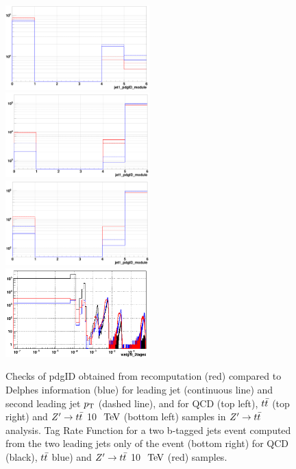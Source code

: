 \documentclass{cernrep}
\begin{document}
\begin{figure}[!htb]\centering
\includegraphics[width=0.495\textwidth]{Fig/check_TRF/Zptt/jet12pdgID_QCD5f_redModule_blueDELPHES.png}
\includegraphics[width=0.495\textwidth]{Fig/check_TRF/Zptt/jet12pdgID_ttbar_redModule_blueDELPHES.png}
\includegraphics[width=0.495\textwidth]{Fig/check_TRF/Zptt/jet12pdgID_Zptt10TeV_redModule_blueDELPHES.png}
\includegraphics[width=0.495\textwidth]{Fig/check_TRF/Zptt/TRF2tagex_module_redZptt10TeV_blackQCD_bluettbar.png}
\caption{Checks of pdgID obtained from recomputation (red) compared to Delphes information (blue) for leading jet (continuous line) and second leading jet $p\sb{\scriptstyle\mathrm{T}}$ (dashed line), and for QCD (top left), $t\bar{t}$ (top right) and $Z^{\prime} \rightarrow t\bar{t}$ 10 $\TeV$ (bottom left) samples in $Z^{\prime} \rightarrow t\bar{t}$ analysis. Tag Rate Function for a two b-tagged jets event computed from the two leading jets only of the event (bottom right) for QCD (black), $t\bar{t}$ blue) and $Z^{\prime} \rightarrow t\bar{t}$ 10 $\TeV$ (red) samples.}
\label{fig:Zptt_TRFchecks}
\end{figure}
\end{document}
